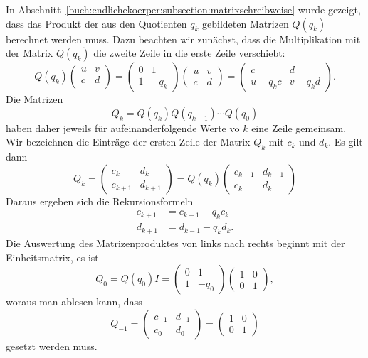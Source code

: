In Abschnitt~\ref{buch:endlichekoerper:subsection:matrixschreibweise}
wurde gezeigt, dass das Produkt der aus den Quotienten $q_k$ gebildeten
Matrizen $Q(q_k)$ berechnet werden muss.
Dazu beachten wir zunächst, dass die Multiplikation mit der Matrix
$Q(q_k)$ die zweite Zeile in die erste Zeile verschiebt:
\[
Q(q_k)
\begin{pmatrix}
u&v\\
c&d\\
\end{pmatrix}
=
\begin{pmatrix}0&1\\1&-q_k\end{pmatrix}
\begin{pmatrix}
u&v\\
c&d
\end{pmatrix}
=
\begin{pmatrix}
c&d\\
u-q_kc&v-q_kd
\end{pmatrix}.
\]
Die Matrizen
\[
Q_k = Q(q_k)Q(q_{k-1})\cdots Q(q_0)
\]
haben daher jeweils für aufeinanderfolgende Werte vo $k$ eine Zeile
gemeinsam.
Wir bezeichnen die Einträge der ersten Zeile der Matrix $Q_k$ mit
$c_k$ und $d_k$.
Es gilt dann
\[
Q_k
=
\begin{pmatrix}
c_{k}  &d_{k}  \\
c_{k+1}&d_{k+1}
\end{pmatrix}
=
Q(q_k)
\begin{pmatrix}
c_{k-1}&d_{k-1}\\
c_{k}  &d_{k}
\end{pmatrix}
\]
Daraus ergeben sich die Rekursionsformeln
\begin{equation}
\begin{aligned}
c_{k+1}&=c_{k-1}-q_kc_k\\
d_{k+1}&=d_{k-1}-q_kd_k.
\end{aligned}
\label{buch:endlichekoerper:eqn:cdrekursion}
\end{equation}
Die Auswertung des Matrizenproduktes von links nach rechts beginnt mit
der Einheitsmatrix, es ist
\[
Q_0
=
Q(q_0) I
=
\begin{pmatrix}
0&1\\
1&-q_0
\end{pmatrix}
\begin{pmatrix}
1&0\\0&1\end{pmatrix},
\]
woraus man ablesen kann, dass
\begin{equation}
Q_{-1}
=
\begin{pmatrix}
c_{-1}&d_{-1}\\
c_0&d_0
\end{pmatrix}
=
\begin{pmatrix}
1&0\\
0&1
\end{pmatrix}
\label{buch:endlichekoerper:eqn:cdinitial}
\end{equation}
gesetzt werden muss.

